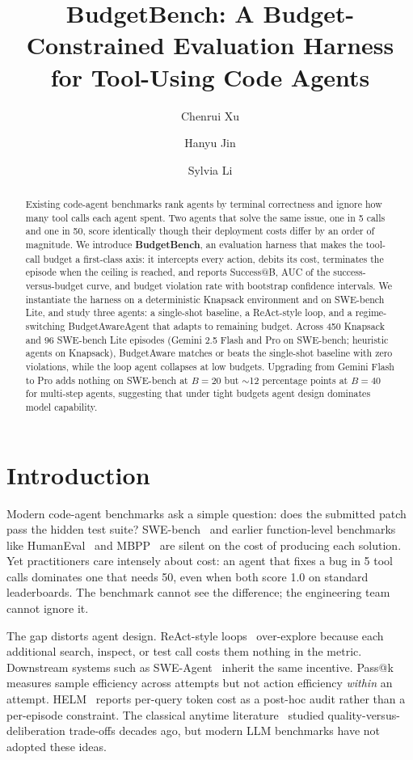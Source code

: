 \documentclass[journal=jacsat,manuscript=article]{achemso}
\author{Chenrui Xu}
\affiliation{Carnegie Mellon University, Pittsburgh, PA, USA}
\author{Hanyu Jin}
\affiliation{Carnegie Mellon University, Pittsburgh, PA, USA}
\author{Sylvia Li}
\affiliation{Carnegie Mellon University, Pittsburgh, PA, USA}
\title[BudgetBench]{BudgetBench: A Budget-Constrained Evaluation Harness for Tool-Using Code Agents}
\begin{document}
\begin{abstract}
Existing code-agent benchmarks rank agents by terminal correctness and
ignore how many tool calls each agent spent. Two agents that solve the
same issue, one in 5 calls and one in 50, score identically though
their deployment costs differ by an order of magnitude. We introduce
\textbf{BudgetBench}, an evaluation harness that makes the tool-call
budget a first-class axis: it intercepts every action, debits its
cost, terminates the episode when the ceiling is reached, and reports
Success@B, AUC of the success-versus-budget curve, and budget
violation rate with bootstrap confidence intervals. We instantiate
the harness on a deterministic Knapsack environment and on SWE-bench
Lite, and study three agents: a single-shot baseline, a ReAct-style
loop, and a regime-switching BudgetAwareAgent that adapts to remaining
budget. Across 450 Knapsack and 96 SWE-bench Lite episodes (Gemini 2.5
Flash and Pro on SWE-bench; heuristic agents on Knapsack),
BudgetAware matches or beats the single-shot baseline with zero
violations, while the loop agent collapses at low budgets. Upgrading
from Gemini Flash to Pro adds nothing on SWE-bench at $B = 20$ but
$\sim$12 percentage points at $B = 40$ for multi-step agents,
suggesting that under tight budgets agent design dominates model
capability.
\end{abstract}

\section{Introduction}

Modern code-agent benchmarks ask a simple question: does the submitted
patch pass the hidden test suite? SWE-bench~\cite{jimenez2024swebench}
and earlier function-level benchmarks like
HumanEval~\cite{chen2021codex} and MBPP~\cite{austin2021mbpp} are
silent on the cost of producing each solution. Yet practitioners care
intensely about cost: an agent that fixes a bug in 5 tool calls
dominates one that needs 50, even when both score 1.0 on standard
leaderboards. The benchmark cannot see the difference; the engineering
team cannot ignore it.

The gap distorts agent design. ReAct-style loops~\cite{yao2023react}
over-explore because each additional search, inspect, or test call
costs them nothing in the metric. Downstream systems such as
SWE-Agent~\cite{yang2024sweagent} inherit the same incentive. Pass@k~\cite{chen2021codex} measures sample efficiency
across attempts but not action efficiency \emph{within} an attempt.
HELM~\cite{liang2023helm} reports per-query token cost as a post-hoc
audit rather than a per-episode constraint. The classical anytime
literature~\cite{zilberstein1996anytime} studied
quality-versus-deliberation trade-offs decades ago, but modern LLM
benchmarks have not adopted these ideas.
\end{document}
